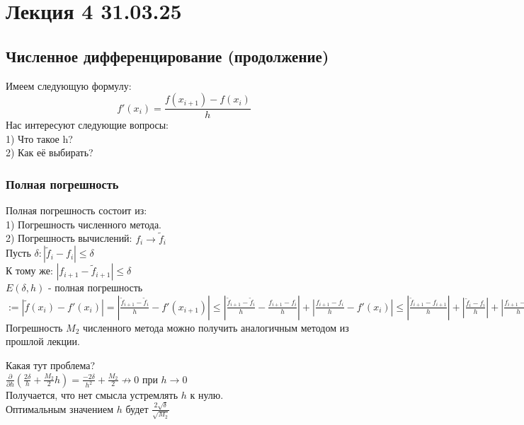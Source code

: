 \section{Лекция 4 31.03.25}

\subsection{Численное дифференцирование (продолжение)}

Имеем следующую формулу:
\begin{equation}
 f'(x_i) = \frac{f(x_{i+1}) - f(x_{i})}{h}
\end{equation}
Нас интересуют следующие вопросы:\\
1) Что такое h?\\
2) Как её выбирать?

\subsubsection{Полная погрешность}
Полная погрешность состоит из:\\
1) Погрешность численного метода.\\
2) Погрешность вычислений: $f_{i}\to \tilde{f}_i $ \\

Пусть $\delta: |\tilde{f}_i-f_i| \leq \delta $ \\
К тому же: $|f_{i+1}-\tilde{f}_{i+1}| \leq \delta $ \\

$E(\delta,h)$ - полная погрешность $:= |\tilde{f}(x_{i})-f'(x_{i})|=|\frac{\tilde{f}_{i+1} - \tilde{f}_{i}}{h} -f'(x_{i+1})| \leq |\frac{\tilde{f}_{i+1} - \tilde{f}_{i}}{h} - \frac{f_{i+1} - f_{i}}{h}| + |\frac{f_{i+1} - f_{i}}{h} -f'(x_{i})|  \leq  |\frac{\tilde{f}_{i+1} - f_{i+1}}{h}| + |\frac{\tilde{f}_{i} - f_{i}}{h}| + |\frac{f_{i+1} - f_{i}}{h} -f'(x_{i})|  \leq \frac{2\delta}{h} + \frac{M_2}{2}h $ \\
Погрешность $M_2$ численного метода можно получить аналогичным методом из прошлой лекции.


Какая тут проблема?\\
$\frac{\partial}{\partial h}(\frac{2\delta}{h} + \frac{M_2}{2}h) = \frac{-2\delta}{h^2} + \frac{M_2}{2}  \nrightarrow 0$ при $h \to 0$\\
Получается, что нет смысла устремлять $h$ к нулю.\\
Оптимальным значением $h$ будет $\frac{2\sqrt{\delta}}{\sqrt{M_2}}$\\



